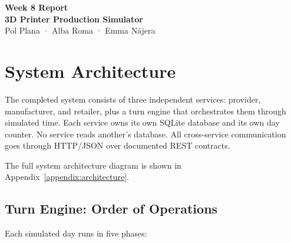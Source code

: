\documentclass[
]{article}
\author{}
\date{}
\begin{document}
\begin{center}
    {\LARGE\textbf{Week 8 Report}}\\[0.5em]
    {\LARGE\textbf{3D Printer Production Simulator}}\\[0.7em]
    {\normalsize Pol Plana · Alba Roma · Emma Nájera}
\end{center}

\vspace{1em}

\section{System Architecture}\label{a-system-architecture}

The completed system consists of three independent services: provider, manufacturer, and retailer, plus a turn engine that
orchestrates them through simulated time. Each service owns its own
SQLite database and its own day counter. No service reads another's
database. All cross-service communication goes through HTTP/JSON over
documented REST contracts.

The full system architecture diagram is shown in Appendix~\ref{appendix:architecture}.

\subsection{Turn Engine: Order of
Operations}\label{turn-engine-order-of-operations}

Each simulated day runs in five phases:
\end{document}
